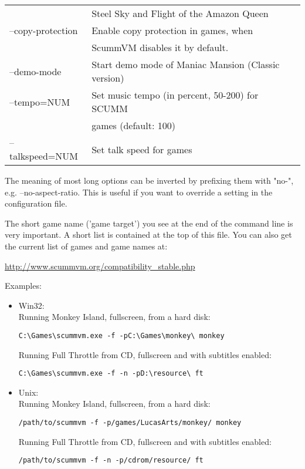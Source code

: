 \begin{tabular}{ll}
                          &Steel Sky and Flight of the Amazon Queen\\
  --copy-protection       &Enable copy protection in games, when\\
                          &ScummVM disables it by default.\\
  --demo-mode             &Start demo mode of Maniac Mansion (Classic version)\\
  --tempo=NUM             &Set music tempo (in percent, 50-200) for SCUMM\\
                          &games (default: 100)\\
  --talkspeed=NUM         &Set talk speed for games\\
\end{tabular}

The meaning of most long options can be inverted by prefixing them with "no-",
e.g. --no-aspect-ratio. This is useful if you want to override a setting in the
configuration file.

The short game name ('game target') you see at the end of the command
line is very important. A short list is contained at the top of this
file. You can also get the current list of games and game names at:

\begin{center}
  \url{http://www.scummvm.org/compatibility_stable.php}
\end{center}

Examples:
\begin{itemize}
\item Win32:\\
Running Monkey Island, fullscreen, from a hard disk:
\begin{verbatim}
C:\Games\scummvm.exe -f -pC:\Games\monkey\ monkey
\end{verbatim}
  Running Full Throttle from CD, fullscreen and with subtitles enabled:
\begin{verbatim}
C:\Games\scummvm.exe -f -n -pD:\resource\ ft
\end{verbatim}
 \item Unix:\\
  Running Monkey Island, fullscreen, from a hard disk:
\begin{verbatim}
/path/to/scummvm -f -p/games/LucasArts/monkey/ monkey
\end{verbatim}
  Running Full Throttle from CD, fullscreen and with subtitles enabled:
\begin{verbatim}
/path/to/scummvm -f -n -p/cdrom/resource/ ft
\end{verbatim}
\end{itemize}

